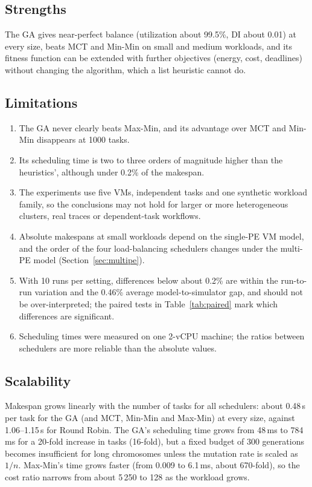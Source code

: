 \documentclass[journal,onecolumn,12pt]{IEEEtran}
\begin{document}
\subsection{Strengths}
The GA gives near-perfect balance (utilization about 99.5\%, DI about 0.01) at every size, beats MCT and Min-Min on small and medium workloads, and its fitness function can be extended with further objectives (energy, cost, deadlines) without changing the algorithm, which a list heuristic cannot do.

\subsection{Limitations}
\begin{enumerate}
\item The GA never clearly beats Max-Min, and its advantage over MCT and Min-Min disappears at 1000 tasks.
\item Its scheduling time is two to three orders of magnitude higher than the heuristics', although under 0.2\% of the makespan.
\item The experiments use five VMs, independent tasks and one synthetic workload family, so the conclusions may not hold for larger or more heterogeneous clusters, real traces or dependent-task workflows.
\item Absolute makespans at small workloads depend on the single-PE VM model, and the order of the four load-balancing schedulers changes under the multi-PE model (Section~\ref{sec:multipe}).
\item With 10 runs per setting, differences below about 0.2\% are within the run-to-run variation and the 0.46\% average model-to-simulator gap, and should not be over-interpreted; the paired tests in Table~\ref{tab:paired} mark which differences are significant.
\item Scheduling times were measured on one 2-vCPU machine; the ratios between schedulers are more reliable than the absolute values.
\end{enumerate}

\subsection{Scalability}
Makespan grows linearly with the number of tasks for all schedulers: about 0.48\,s per task for the GA (and MCT, Min-Min and Max-Min) at every size, against 1.06--1.15\,s for Round Robin. The GA's scheduling time grows from 48\,ms to 784\,ms for a 20-fold increase in tasks (16-fold), but a fixed budget of 300 generations becomes insufficient for long chromosomes unless the mutation rate is scaled as $1/n$. Max-Min's time grows faster (from 0.009 to 6.1\,ms, about 670-fold), so the cost ratio narrows from about 5\,250 to 128 as the workload grows.
\end{document}
